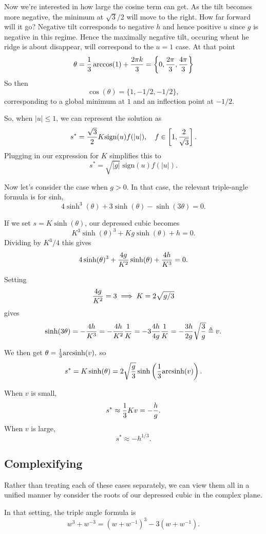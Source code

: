 \documentclass[10pt]{article}
\begin{document}
Now we're interested in how large the cosine term can get. As the tilt becomes more negative, the minimum at $\sqrt{3}/2$ will move to the right. How far forward will it go? Negative tilt corresponds to negative $h$ and hence positive $u$ since $g$ is negative in this regime. Hence the maximally negative tilt, occuring whent he ridge is about disappear, will correspond to the $u = 1$ case. At that point $$ \theta = {1 \over 3} \arccos(1) + {2 \pi k \over 3} = \left\{0,  {2 \pi \over 3},  {4 \pi \over 3} \right\}$$ So then $$ \cos(\theta) = \{1, -{1/2}, -{1/2}\},$$ corresponding to a global minimum at $1$ and an inflection point at $-1/2$.

So, when $|u| \le 1$, we can represent the solution as $$ s^* = { \sqrt{3} \over 2}  K  \text{sign}(u) f(|u|), \quad f \in \left[1, {2\over \sqrt{3}} \right].$$ Plugging in our expression for $K$ simplifies this to $$ s^* = \sqrt{|g|} \; \text{sign}(u) f(|u|).$$

Now let's consider the case when $g > 0$. In that case, the relevant triple-angle formula is for sinh, $$ 4 \sinh^3(\theta) + 3 \sinh(\theta) - \sinh(3 \theta) = 0.$$

If we set $s = K \sinh (\theta)$, our depressed cubic becomes $$ K^3 \sinh(\theta)^3 + K g \sinh(\theta) + h = 0.$$
Dividing by $K^3/4$ this gives $$ 4 \sinh(\theta)^3 + {4 g \over K^2} \sinh(\theta) + {4h \over K^3} = 0.$$

Setting $$ {4g \over K^2} = 3 \implies K = 2 \sqrt{ g / 3}$$ gives $$  \sinh(3 \theta) = - {4 h \over K^3} = -{4 h \over K^2}{1 \over K} = -3 { 4 h \over 4 g} {1 \over K} = -{3h \over 2 g} \sqrt{3 \over g} \triangleq v.$$

We then get $\theta = {1 \over 3} \text{arcsinh}(v),$ so $$s^* = K \sinh(\theta) = 2\sqrt{g \over 3} \sinh\left({1 \over 3}\text{arcsinh}(v)\right).$$

When $v$ is small, $$s^* \approx {1\over 3}K v = -{h \over g}. $$ When $v$ is large, $$ s^* \approx -h^{1/3}.$$

\subsection*{Complexifying}
Rather than treating each of these cases separately, we can view them all in a unified manner by consider the roots of our depressed cubic in the complex plane.

In that setting, the triple angle formula is $$ w^3 + w^{-3} = (w + w^{-1})^3 - 3 (w + w^{-1}).$$
\end{document}
